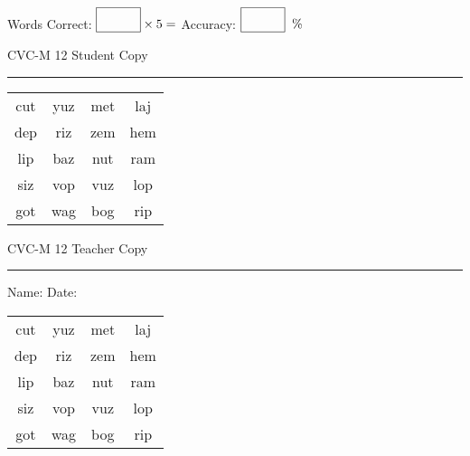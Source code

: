 \documentclass{memoir}
\begin{document}
\small

Words Correct: $\fbox{\phantom{\huge 100}} \times 5 = $ Accuracy: $\fbox{\phantom{\huge 100}}\;\; \%$ 

\vfill

\newpage


\footnotesize \noindent
CVC-M 12 \hfill Student Copy
\smallskip
\hrule

\Large

\setlength{\tabcolsep}{14pt}
\def\arraystretch{2}

{\selectfont


\begin{vplace}[0.5]
\begin{center}
\begin{tabular}{cccc}
cut & yuz & met & laj \\
dep & riz & zem & hem \\
lip & baz & nut & ram \\
siz & vop & vuz & lop \\
got & wag & bog & rip \\
\end{tabular}
\end{center}
\end{vplace}

}

\newpage

\footnotesize \noindent
CVC-M 12 \hfill Teacher Copy
\smallskip
\hrule

\small

\vfill

\noindent
Name: \underline{\hspace{1.75in}} \hfill Date: \underline{\hspace{1in}}

\Large

{\selectfont


\begin{vplace}[0.5]
\begin{center}
\begin{tabular}{cccc}
cut & yuz & met & laj \\
dep & riz & zem & hem \\
lip & baz & nut & ram \\
siz & vop & vuz & lop \\
got & wag & bog & rip \\
\end{tabular}
\end{center}
\end{vplace}



}
\end{document}
